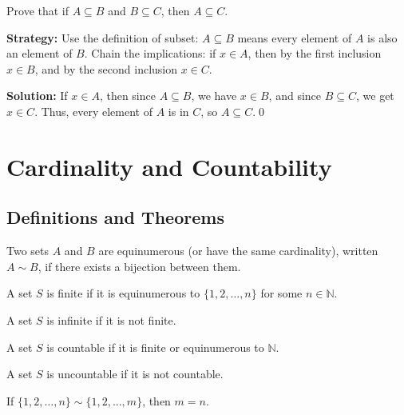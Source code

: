 \begin{problembox}
Prove that if \( A \subseteq B \) and \( B \subseteq C \), then \( A \subseteq C \).
\end{problembox}

\noindent\textbf{Strategy:} Use the definition of subset: $A \subseteq B$ means every element of $A$ is also an element of $B$. Chain the implications: if $x \in A$, then by the first inclusion $x \in B$, and by the second inclusion $x \in C$.

\noindent\bigskip\noindent\textbf{Solution:}  
If \( x \in A \), then since \( A \subseteq B \), we have \( x \in B \), and since \( B \subseteq C \), we get \( x \in C \).  
Thus, every element of \( A \) is in \( C \), so \( A \subseteq C \).\qed

\section{Cardinality and Countability}

\subsection*{Definitions and Theorems}

\begin{definition}
Two sets $A$ and $B$ are equinumerous (or have the same cardinality), written $A \sim B$, if there exists a bijection between them.
\end{definition}

\begin{definition}
A set $S$ is finite if it is equinumerous to $\{1, 2, \ldots, n\}$ for some $n \in \mathbb{N}$.
\end{definition}

\begin{definition}
A set $S$ is infinite if it is not finite.
\end{definition}

\begin{definition}
A set $S$ is countable if it is finite or equinumerous to $\mathbb{N}$.
\end{definition}

\begin{definition}
A set $S$ is uncountable if it is not countable.
\end{definition}

\begin{theorem}
If $\{1, 2, \ldots, n\} \sim \{1, 2, \ldots, m\}$, then $m = n$.
\end{theorem}


